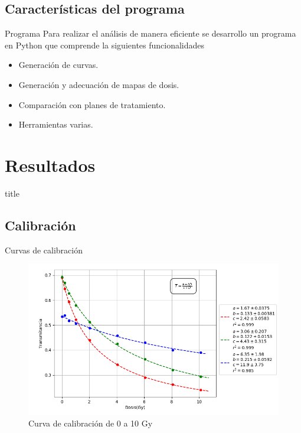 \documentclass[12pt]{beamer}
\begin{document}
\subsection{Características del programa}

\begin{frame}{Programa}
Para realizar el análisis de manera eficiente se desarrollo un programa en Python que comprende la siguientes funcionalidades
\begin{itemize}
	\item Generación de curvas.
	\item Generación y adecuación de mapas de dosis.
	\item Comparación con planes de tratamiento.
	\item Herramientas varias.
\end{itemize}
\end{frame}

\section{Resultados}
\begin{frame}
\vfill
\centering
\begin{beamercolorbox}[sep=8pt,center,shadow=true,rounded=true]{title}
	\insertsectionhead\par%
\end{beamercolorbox}
\vfill
\end{frame}

\subsection{Calibración}

\begin{frame}{Curvas de calibración}
\begin{figure}
	\centering
	\includegraphics[width=0.7\linewidth]{images/calibracionMulti_2.png}
	\caption{Curva de calibración de 0 a 10 Gy}
\end{figure}
\end{frame}
\end{document}
